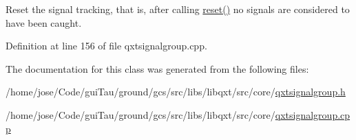 Reset the signal tracking, that is, after calling \hyperlink{class_qxt_signal_group_aad35385388040895c7cf21bfe9a753b3}{reset()} no signals are considered to have been caught. 

Definition at line 156 of file qxtsignalgroup.\-cpp.



The documentation for this class was generated from the following files\-:\begin{DoxyCompactItemize}
\item 
/home/jose/\-Code/gui\-Tau/ground/gcs/src/libs/libqxt/src/core/\hyperlink{qxtsignalgroup_8h}{qxtsignalgroup.\-h}\item 
/home/jose/\-Code/gui\-Tau/ground/gcs/src/libs/libqxt/src/core/\hyperlink{qxtsignalgroup_8cpp}{qxtsignalgroup.\-cpp}\end{DoxyCompactItemize}
